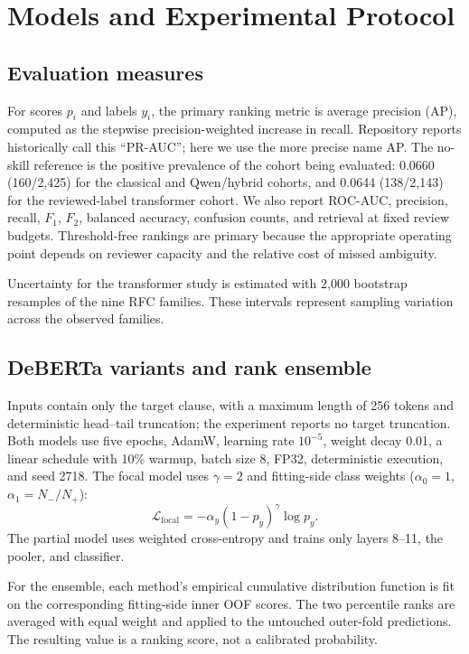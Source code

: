\documentclass[12pt,a4paper,oneside]{report}
\begin{document}
\section{Models and Experimental Protocol}

\subsection{Evaluation measures}

For scores $p_i$ and labels $y_i$, the primary ranking metric is average precision (AP), computed as the stepwise precision-weighted increase in recall. Repository reports historically call this ``PR-AUC''; here we use the more precise name AP. The no-skill reference is the positive prevalence of the cohort being evaluated: 0.0660 (160/2,425) for the classical and Qwen/hybrid cohorts, and 0.0644 (138/2,143) for the reviewed-label transformer cohort. We also report ROC-AUC, precision, recall, $F_1$, $F_2$, balanced accuracy, confusion counts, and retrieval at fixed review budgets. Threshold-free rankings are primary because the appropriate operating point depends on reviewer capacity and the relative cost of missed ambiguity.

Uncertainty for the transformer study is estimated with 2,000 bootstrap resamples of the nine RFC families. These intervals represent sampling variation across the observed families.

\subsection{DeBERTa variants and rank ensemble}

Inputs contain only the target clause, with a maximum length of 256 tokens and deterministic head--tail truncation; the experiment reports no target truncation. Both models use five epochs, AdamW, learning rate $10^{-5}$, weight decay 0.01, a linear schedule with 10\% warmup, batch size 8, FP32, deterministic execution, and seed 2718. The focal model uses $\gamma=2$ and fitting-side class weights ($\alpha_0=1$, $\alpha_1=N_{-}/N_{+}$):
\begin{equation}
\mathcal{L}_{\mathrm{focal}}=-\alpha_y(1-p_y)^\gamma\log p_y.
\end{equation}
The partial model uses weighted cross-entropy and trains only layers 8--11, the pooler, and classifier.

For the ensemble, each method's empirical cumulative distribution function is fit on the corresponding fitting-side inner OOF scores. The two percentile ranks are averaged with equal weight and applied to the untouched outer-fold predictions. The resulting value is a ranking score, not a calibrated probability.
\end{document}

